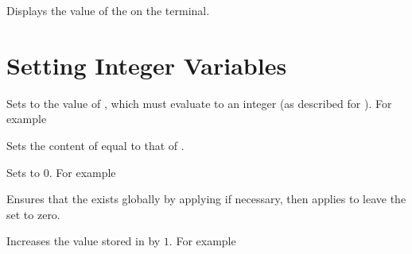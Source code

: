 \documentclass[oneside]{book}
\begin{document}
\begin{function}{\IntVarShow}
\begin{syntax}
 
\end{syntax}
Displays the value of the  on the terminal.
\end{function}

\section{Setting Integer Variables}

\begin{function}{\IntSet}
\begin{syntax}
  
\end{syntax}
Sets  to the value of ,
which must evaluate to an integer (as described for ).
For example
\begin{demohigh}
\IntSet {}
\IntUse \lTmpaInt
\end{demohigh}
\end{function}

\begin{function}{\IntSetEq}
\begin{syntax}
  
\end{syntax}
Sets the content of  equal to that of
.
\end{function}

\begin{function}{\IntZero}
\begin{syntax}
 
\end{syntax}
Sets  to $0$. For example
\begin{demohigh}
\IntSet {}
\IntZero \lTmpaInt
\IntUse \lTmpaInt
\end{demohigh}
\end{function}

\begin{function}{\IntZeroNew}
\begin{syntax}
 
\end{syntax}
Ensures that the  exists globally by applying
 if necessary, then applies  to leave
the  set to zero.
\end{function}

\begin{function}{\IntIncr}
\begin{syntax}
 
\end{syntax}
Increases the value stored in  by $1$.
For example
\begin{demohigh}
\IntSet {}
\IntIncr \lTmpaInt
\IntUse \lTmpaInt
\end{demohigh}
\end{function}
\end{document}
